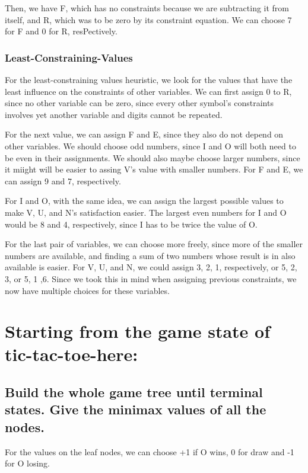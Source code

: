 \documentclass{article}
\begin{document}
		Then, we have F, which has no constraints because we are subtracting it from itself, and R, which was to
		be zero by its constraint equation. We can choose 7 for F and 0 for R, resPectively.
		\subsubsection{Least-Constraining-Values}
		For the least-constraining values heuristic, we look for the values that have the least influence 
		on the constraints of other variables. We can first assign 0 to R, since no other variable can 
		be zero, since every other symbol's constraints involves yet another variable and digits cannot
		be repeated.

		For the next value, we can assign F and E, since they also do not depend on other variables. We 
		should choose odd numbers, since I and O will both need to be even in their assignments. We 
		should also maybe choose larger numbers, since it miight will be easier to assing V's value 
		with smaller numbers. For F and E, we can assign 9 and 7, respectively.

		For I and O, with the same idea, we can assign the largest possible values to make V, U, and N's
		satisfaction easier. The largest even numbers for I and O would be 8 and 4, respectively, since I 
		has to be twice the value of O.

		For the last pair of variables, we can choose more freely, since more of the smaller numbers are
		available, and finding a sum of two numbers whose result is in also available is easier. For
		V, U, and N, we could assign 3, 2, 1, respectively, or 5, 2, 3, or 5, 1 ,6. Since we took this 
		in mind when assigning previous constraints, we now have multiple choices for these variables.
\section{Starting from the game state of tic-tac-toe-here:}
	\subsection{Build the whole game tree until terminal states. Give the minimax values of all the nodes.}
		For the values on the leaf nodes, we can choose +1 if O wins, 0 for draw and -1 for O losing.
\end{document}
